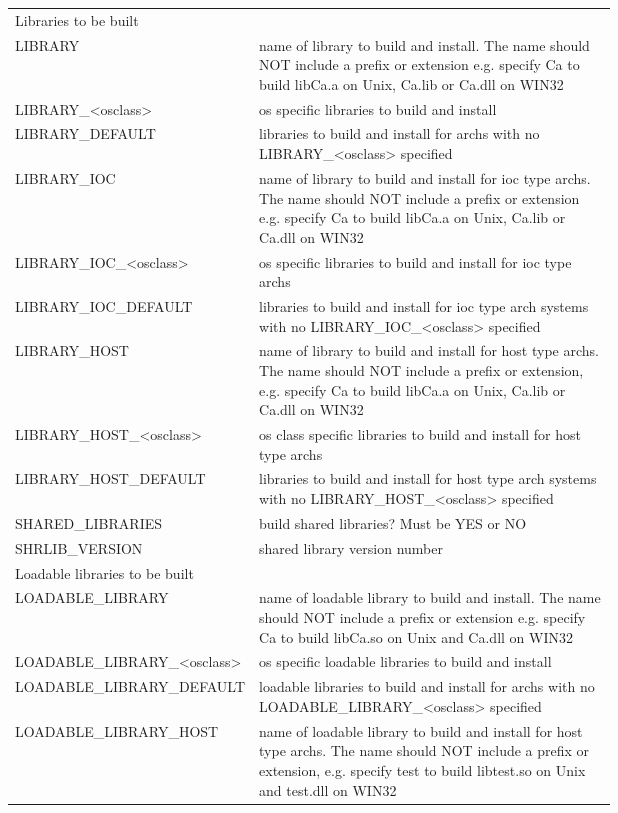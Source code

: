 \begin{center}
\begin{longtable}{lp{0.7\linewidth}}
Libraries to be built & \\
LIBRARY & name of library to build and install. The name should NOT include a prefix or extension e.g. specify Ca to build libCa.a on Unix, Ca.lib or Ca.dll on WIN32\\
LIBRARY\_\textless{}osclass\textgreater{} & os specific libraries to build and install\\
LIBRARY\_DEFAULT & libraries to build and install for archs with no LIBRARY\_\textless{}osclass\textgreater{} specified\\
LIBRARY\_IOC & name of library to build and install for ioc type archs. The name should NOT include a prefix or extension e.g. specify Ca to build libCa.a on Unix, Ca.lib or Ca.dll on WIN32\\
LIBRARY\_IOC\_\textless{}osclass\textgreater{} & os specific libraries to build and install for ioc type archs\\
LIBRARY\_IOC\_DEFAULT & libraries to build and install for ioc type arch systems with no LIBRARY\_IOC\_\textless{}osclass\textgreater{} specified\\
LIBRARY\_HOST & name of library to build and install for host type archs. The name should NOT include a prefix or extension, e.g. specify Ca to build libCa.a on Unix, Ca.lib or Ca.dll on WIN32\\
LIBRARY\_HOST\_\textless{}osclass\textgreater{} & os class specific libraries to build and install for host type archs\\
LIBRARY\_HOST\_DEFAULT & libraries to build and install for host type arch systems with no LIBRARY\_HOST\_\textless{}osclass\textgreater{} specified\\
SHARED\_LIBRARIES & build shared libraries? Must be YES or NO\\
SHRLIB\_VERSION & shared library version number\\
Loadable libraries to be built & \\
LOADABLE\_LIBRARY & name of loadable library to build and install. The name should NOT include a prefix or extension e.g. specify Ca to build libCa.so on Unix and Ca.dll on WIN32\\
LOADABLE\_LIBRARY\_\textless{}osclass\textgreater{} & os specific loadable libraries to build and install\\
LOADABLE\_LIBRARY\_DEFAULT & loadable libraries to build and install for archs with no LOADABLE\_LIBRARY\_\textless{}osclass\textgreater{} specified\\
LOADABLE\_LIBRARY\_HOST & name of loadable library to build and install for host type archs. The name should NOT include a prefix or extension, e.g. specify test to build libtest.so on Unix and test.dll on WIN32\\

\end{longtable}
\end{center}
